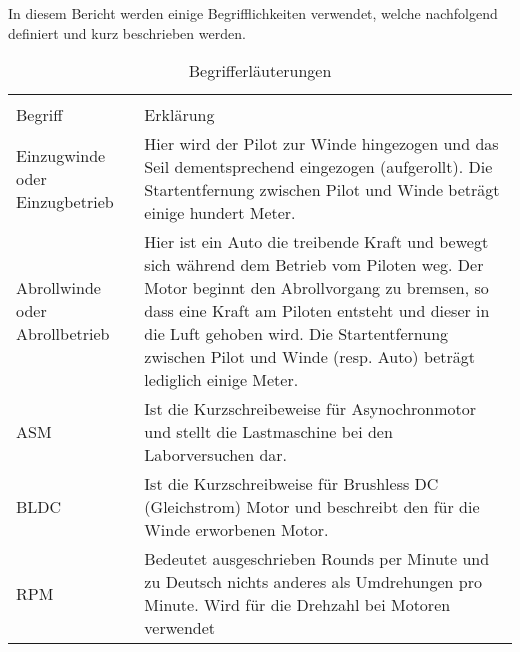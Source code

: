 In diesem Bericht werden einige Begrifflichkeiten verwendet, welche nachfolgend definiert und kurz beschrieben werden.
\begin{table}[H]
	\centering
	\begin{tabular}{p{3cm} p{11cm}}
		\multicolumn{2}{c}{}\\
		{Begriff} & {Erklärung} \\ \hline
		Einzugwinde oder Einzugbetrieb    &   Hier wird der Pilot zur Winde hingezogen und das Seil dementsprechend eingezogen (aufgerollt). Die Startentfernung zwischen Pilot und Winde beträgt einige hundert Meter.   \\
		Abrollwinde oder Abrollbetrieb    &    Hier ist ein Auto die treibende Kraft und bewegt sich während dem Betrieb vom Piloten weg. Der Motor beginnt den Abrollvorgang zu bremsen, so dass eine Kraft am Piloten entsteht und dieser in die Luft gehoben wird. Die Startentfernung zwischen Pilot und Winde (resp. Auto) beträgt lediglich einige Meter.  \\
		ASM    &  Ist die Kurzschreibeweise für Asynochronmotor und stellt die Lastmaschine bei den Laborversuchen dar. \\
		BLDC    &  Ist die Kurzschreibweise für Brushless DC (Gleichstrom) Motor und beschreibt den für die Winde erworbenen Motor. \\
		RPM   & Bedeutet ausgeschrieben Rounds per Minute und zu Deutsch nichts anderes als Umdrehungen pro Minute. Wird für die Drehzahl bei Motoren verwendet 
	\end{tabular}
	\caption{Begrifferläuterungen}
	\label{tab:Begrifferlaeuterungen}
\end{table}


